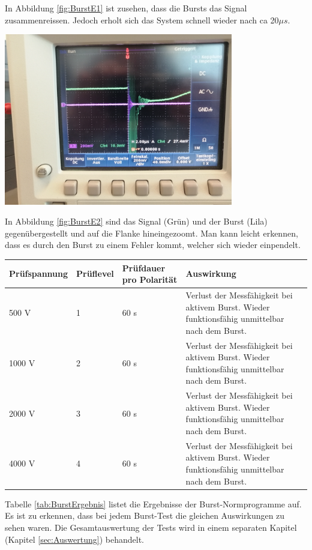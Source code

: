 In Abbildung \ref{fig:BurstE1} ist zusehen, dass die Bursts das Signal zusammenreissen. Jedoch erholt sich das System schnell wieder nach ca 20$\mu s$.\\
[0.5cm]
\begin{minipage}[b][10cm][t]{1\textwidth}
\centering
\includegraphics[angle=0,width=0.75\textwidth]{graphics/BurstE2.jpg}
\label{fig:BurstE2}
\end{minipage}
In Abbildung \ref{fig:BurstE2} sind das Signal (Grün) und der Burst (Lila) gegenübergestellt und auf die Flanke hineingezoomt. Man kann leicht erkennen, dass es durch den Burst zu einem Fehler kommt, welcher sich wieder einpendelt.\\
[0.25cm]
\begin{tabular}{|l|l|l|p{5cm}|}
\hline 
\rule[-1ex]{0pt}{2.5ex} Prüfspannung & Prüflevel & Prüfdauer pro Polarität & Auswirkung \\ 
\hline 
\rule[-1ex]{0pt}{2.5ex} 500 V & 1 & 60 s & Verlust der Messfähigkeit bei aktivem Burst. Wieder funktionsfähig unmittelbar nach dem Burst. \\ 
\hline 
\rule[-1ex]{0pt}{2.5ex} 1000 V & 2 & 60 s & Verlust der Messfähigkeit bei aktivem Burst. Wieder funktionsfähig unmittelbar nach dem Burst. \\ 
\hline 
\rule[-1ex]{0pt}{2.5ex} 2000 V & 3 & 60 s & Verlust der Messfähigkeit bei aktivem Burst. Wieder funktionsfähig unmittelbar nach dem Burst. \\ 
\hline 
\rule[-1ex]{0pt}{2.5ex} 4000 V & 4 & 60 s & Verlust der Messfähigkeit bei aktivem Burst. Wieder funktionsfähig unmittelbar nach dem Burst. \\ 
\hline 
\end{tabular} 
\label{tab:BurstErgebnis}
\vspace*{0.25cm}
Tabelle \ref{tab:BurstErgebnis} listet die Ergebnisse der Burst-Normprogramme auf. Es ist zu erkennen, dass bei jedem Burst-Test die gleichen Auswirkungen zu sehen waren. Die Gesamtauswertung der Tests wird in einem separaten Kapitel (Kapitel \ref{sec:Auswertung}) behandelt.\\

